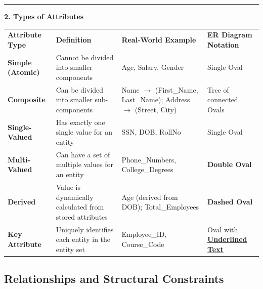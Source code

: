\documentclass[11pt,a4paper]{article}
\newcommand{\ic}[1]{\mbox{\colorbox{AnthCodeBG}{\footnotesize\ttfamily\textcolor{AnthBlue}{#1}}}}
\newcommand{\concept}[1]{%
  \vspace{3pt}\noindent\textcolor{AnthGreen}{\rule{3.5pt}{10pt}}\enspace
  \textbf{\sffamily\color{AnthDark}#1}\par\vspace{2pt}%
}
\begin{document}
\concept{2. Types of Attributes}
\begin{center}
\small
\begin{tabularx}{\textwidth}{L{3.0cm} L{3.5cm} X L{3.0cm}}
  \color{white}\textbf{Attribute Type} & \color{white}\textbf{Definition} & \color{white}\textbf{Real-World Example} & \color{white}\textbf{ER Diagram Notation} \\
   \textbf{Simple (Atomic)} & Cannot be divided into smaller components & \ic{Age}, \ic{Salary}, \ic{Gender} & Single Oval \\
  \textbf{Composite} & Can be divided into smaller sub-components & \ic{Name} $\to$ (\ic{First\_Name}, \ic{Last\_Name}); \ic{Address} $\to$ (\ic{Street}, \ic{City}) & Tree of connected Ovals \\
   \textbf{Single-Valued} & Has exactly one single value for an entity & \ic{SSN}, \ic{DOB}, \ic{RollNo} & Single Oval \\
  \textbf{Multi-Valued} & Can have a set of multiple values for an entity & \ic{Phone\_Numbers}, \ic{College\_Degrees} & \textbf{Double Oval} \\
   \textbf{Derived} & Value is dynamically calculated from stored attributes & \ic{Age} (derived from \ic{DOB}); \ic{Total\_Employees} & \textbf{Dashed Oval} \\
  \textbf{Key Attribute} & Uniquely identifies each entity in the entity set & \ic{Employee\_ID}, \ic{Course\_Code} & Oval with \textbf{\underline{Underlined Text}} \\
\end{tabularx}
\end{center}

\subsection{Relationships and Structural Constraints}
\end{document}
